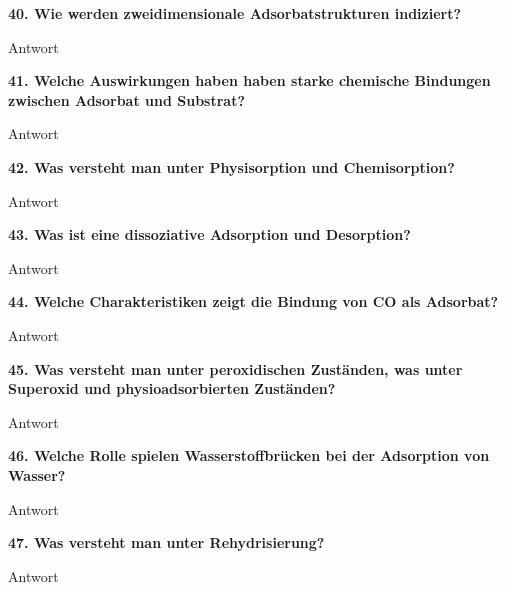 \noindent\textbf{40. Wie werden zweidimensionale Adsorbatstrukturen indiziert?}\\
\begin{addmargin}[25pt]{0pt}
Antwort\\
\end{addmargin}

\noindent\textbf{41. Welche Auswirkungen haben haben starke chemische Bindungen zwischen Adsorbat und Substrat?}\\
\begin{addmargin}[25pt]{0pt}
Antwort\\
\end{addmargin}

\noindent\textbf{42. Was versteht man unter Physisorption und Chemisorption?}\\
\begin{addmargin}[25pt]{0pt}
Antwort\\
\end{addmargin}

\noindent\textbf{43. Was ist eine dissoziative Adsorption und Desorption?}\\
\begin{addmargin}[25pt]{0pt}
Antwort\\
\end{addmargin}

\noindent\textbf{44. Welche Charakteristiken zeigt die Bindung von CO als Adsorbat?}\\
\begin{addmargin}[25pt]{0pt}
Antwort\\
\end{addmargin}

\noindent\textbf{45. Was versteht man unter peroxidischen Zuständen, was unter Superoxid und physioadsorbierten Zuständen?}\\
\begin{addmargin}[25pt]{0pt}
Antwort\\
\end{addmargin}

\noindent\textbf{46. Welche Rolle spielen Wasserstoffbrücken bei der Adsorption von Wasser?}\\
\begin{addmargin}[25pt]{0pt}
Antwort\\
\end{addmargin}

\noindent\textbf{47. Was versteht man unter Rehydrisierung?}\\
\begin{addmargin}[25pt]{0pt}
Antwort\\
\end{addmargin}

